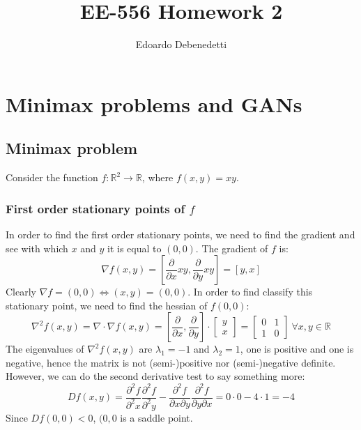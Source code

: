 \documentclass[12pt]{article}
\title{EE-556 Homework 2}
\author{Edoardo Debenedetti}
\begin{document}
\maketitle

\section{Minimax problems and GANs}

\subsection{Minimax problem}

Consider the function $f : \mathbb{R}^2 \rightarrow \mathbb{R}$, where $f(x, y) = xy$.

\subsubsection{First order stationary points of $f$}

In order to find the first order stationary points, we need to find the gradient and see with which $x$ and $y$ it is equal to $(0, 0)$. The gradient of $f$ is:
\begin{equation} \label{eq:f_gradient}
    \nabla f(x, y) = \left [ \frac{\partial}{\partial x} xy, \frac{\partial}{\partial y} xy \right] = [y, x]
\end{equation}
Clearly $\nabla f = (0, 0) \iff (x, y) = (0, 0)$. In order to find classify this stationary point, we need to find the hessian of $f(0, 0)$:
\begin{equation} \label{eq:hessian_f}
    \nabla^2f(x, y) = \nabla \cdot \nabla f(x, y) =
        \left [ \frac{\partial}{\partial x}, \frac{\partial}{\partial y} \right]
        \cdot \begin{bmatrix} y \\ x \end{bmatrix} = 
        \begin{bmatrix} 0 & 1 \\ 1 & 0 \end{bmatrix} \ \forall x,  y \in \mathbb{R}
\end{equation}
The eigenvalues of $\nabla^2f(x, y)$ are $\lambda_{1} = -1$ and $\lambda_{2} = 1$, one is positive and one is negative, hence the matrix is not (semi-)positive nor (semi-)negative definite. However, we can do the second derivative test to say something more:
\begin{equation} \label{eq:f_hessian_det}
    Df(x, y) = \frac{\partial^2 f}{\partial^2 x} \frac{\partial^2 f}{\partial^2 y} - 
        \frac{\partial^2 f}{\partial x \partial y} \frac{\partial^2 f}{\partial y \partial x} = 0 \cdot 0 - 4 \cdot 1 = -4
\end{equation}
Since $Df(0, 0) < 0$, $(0, 0$ is a saddle point.
\end{document}
